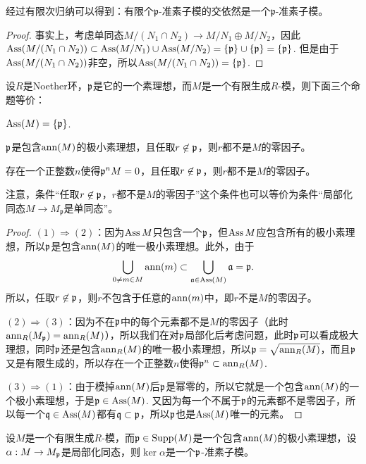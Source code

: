 经过有限次归纳可以得到：有限个$\mathfrak{p}$-准素子模的交依然是一个$\mathfrak{p}$-准素子模。

\begin{proof}
	事实上，考虑单同态$M/(N_1\cap N_2)\to M/N_1\oplus M/N_2$，因此$\operatorname{Ass}(M/(N_1\cap N_2))\subset \operatorname{Ass}(M/N_1)\cup \operatorname{Ass}(M/N_2)=\{\mathfrak{p}\}\cup \{\mathfrak{p}\}=\{\mathfrak{p}\}$. 但是由于$\operatorname{Ass}(M/(N_1\cap N_2))$非空，所以$\operatorname{Ass}(M/(N_1\cap N_2))=\{\mathfrak{p}\}$. 
\end{proof}

\begin{pro}\label{pro:5.1.11}
设$R$是Noether环，$\mathfrak{p}$是它的一个素理想，而$M$是一个有限生成$R$-模，则下面三个命题等价：
\begin{compactenum}[~~~(1)]
\item $\operatorname{Ass}(M)=\{\mathfrak{p}\}$.
\item $\mathfrak{p}$是包含$\operatorname{ann}(M)$的极小素理想，且任取$r\not\in \mathfrak{p}$，则$r$都不是$M$的零因子。
\item 存在一个正整数$n$使得$\mathfrak{p}^n M=0$，且任取$r\not\in \mathfrak{p}$，则$r$都不是$M$的零因子。
\end{compactenum}
\end{pro}

注意，条件“任取$r\not\in \mathfrak{p}$，$r$都不是$M$的零因子”这个条件也可以等价为条件“局部化同态$M\to M_{\mathfrak p}$是单同态”。

\begin{proof}
$(1)\Rightarrow (2)$：因为$\operatorname{Ass} M$只包含一个$\mathfrak{p}$，但$\operatorname{Ass} M$应包含所有的极小素理想，所以$\mathfrak{p}$是包含$\operatorname{ann}(M)$的唯一极小素理想。此外，由于
\[
	\bigcup_{0\neq m\in M}\operatorname{ann}(m)\subset \bigcup_{\mathfrak{a}\in \operatorname{Ass}(M)}\mathfrak{a}=\mathfrak{p}. 
\]
所以，任取$r\not\in \mathfrak{p}$，则$r$不包含于任意的$\operatorname{ann}(m)$中，即$r$不是$M$的零因子。

$(2)\Rightarrow (3)$：因为不在$\mathfrak{p}$中的每个元素都不是$M$的零因子（此时$\operatorname{ann}_R(M_{\mathfrak{p}})=\operatorname{ann}_R(M)$），所以我们在对$\mathfrak{p}$局部化后考虑问题，此时$\mathfrak{p}$可以看成极大理想，同时$\mathfrak{p}$还是包含$\operatorname{ann}_R(M)$的唯一极小素理想，所以$\mathfrak{p}=\sqrt{\operatorname{ann}_R(M)}$，而且$\mathfrak{p}$又是有限生成的，所以存在一个正整数$n$使得$\mathfrak{p}^n\subset \operatorname{ann}_R(M)$. 

$(3)\Rightarrow (1)$：由于模掉$\operatorname{ann}(M)$后$\mathfrak{p}$是幂零的，所以它就是一个包含$\operatorname{ann}(M)$的一个极小素理想，于是$\mathfrak{p} \in \operatorname{Ass}(M)$. 又因为每一个不属于$\mathfrak{p}$的元素都不是零因子，所以每一个$\mathfrak{q}\in \operatorname{Ass}(M)$都有$\mathfrak{q}\subset \mathfrak{p}$，所以$\mathfrak{p}$也是$\operatorname{Ass}(M)$唯一的元素。
\end{proof}

\begin{pro}\label{pro:5.2.13}
	设$M$是一个有限生成$R$-模，而$\mathfrak{p}\in \operatorname{Supp}(M)$是一个包含$\operatorname{ann}(M)$的极小素理想，设$\alpha:M\to M_{\mathfrak{p}}$是局部化同态，则$\ker\alpha$是一个$\mathfrak{p}$-准素子模。
\end{pro}

